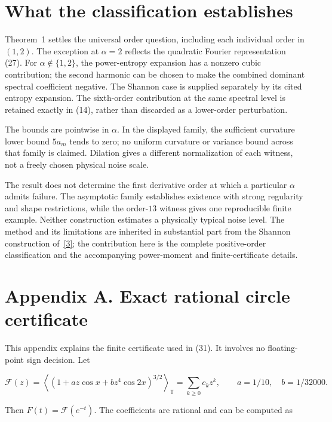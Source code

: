 \documentclass[
  11pt,
]{article}
\begin{document}
\section{What the classification
establishes}\label{what-the-classification-establishes}

Theorem~1 settles the universal order question, including each
individual order in \((1,2)\). The exception at \(\alpha=2\) reflects
the quadratic Fourier representation (27). For \(\alpha\notin\{1,2\}\),
the power-entropy expansion has a nonzero cubic contribution; the second
harmonic can be chosen to make the combined dominant spectral
coefficient negative. The Shannon case is supplied separately by its
cited entropy expansion. The sixth-order contribution at the same
spectral level is retained exactly in (14), rather than discarded as a
lower-order perturbation.

The bounds are pointwise in \(\alpha\). In the displayed family, the
sufficient curvature lower bound \(5a_m\) tends to zero; no uniform
curvature or variance bound across that family is claimed. Dilation
gives a different normalization of each witness, not a freely chosen
physical noise scale.

The result does not determine the first derivative order at which a
particular \(\alpha\) admits failure. The asymptotic family establishes
existence with strong regularity and shape restrictions, while the
order-\(13\) witness gives one reproducible finite example. Neither
construction estimates a physically typical noise level. The method and
its limitations are inherited in substantial part from the Shannon
construction of~\href{https://arxiv.org/abs/2608.30275v1}{{[}3{]}}; the
contribution here is the complete positive-order classification and the
accompanying power-moment and finite-certificate details.

\section*{Appendix A. Exact rational circle
certificate}\label{exact-rational-circle-certificate}

This appendix explains the finite certificate used in (31). It involves
no floating-point sign decision. Let

\[
\mathcal F(z)=\left\langle (1+az\cos x+bz^4\cos 2x)^{3/2}\right\rangle_{\mathbb T}
             =\sum_{k\geq0}c_kz^k,
 \qquad a=1/10,\quad b=1/32000.
\]

Then \(F(t)=\mathcal F(e^{-t})\). The coefficients are rational and can
be computed as
\end{document}
